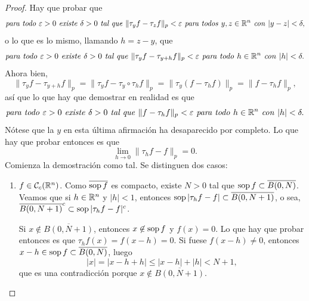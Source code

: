 \documentclass[a4paper, 11pt, oneside]{report}
\begin{document}
\begin{proof}
  Hay que probar que
  \[\textup{\emph{para todo }} \varepsilon > 0 \textup{\emph{ existe }} \delta > 0 \textup{\emph{ tal que }} \|\tau_yf - \tau_zf\|_p < \varepsilon \textup{\emph{ para todos }} y,z\in \mathbb R^n \textup{\emph{ con }} |y-z|<\delta,\]
  o lo que es lo mismo, llamando $h=z-y$, que
  \[\textup{\emph{para todo }} \varepsilon > 0 \textup{\emph{ existe }} \delta > 0 \textup{\emph{ tal que }} \|\tau_yf - \tau_{y+h}f\|_p < \varepsilon \textup{\emph{ para todo }} h\in \mathbb R^n \textup{\emph{ con }} |h|<\delta.\]
  Ahora bien,
  \[\|\tau_yf - \tau_{y+h}f\|_p = \|\tau_yf - \tau_y \circ \tau_h f\|_p = \|\tau_y(f - \tau_hf)\|_p = \|f - \tau_hf\|_p,\]
  así que lo que hay que demostrar en realidad es que
  \[\textup{\emph{para todo }} \varepsilon > 0 \textup{\emph{ existe }} \delta > 0 \textup{\emph{ tal que }} \|f-\tau_hf\|_p < \varepsilon \textup{\emph{ para todo }} h\in \mathbb R^n \textup{\emph{ con }} |h|<\delta.\]
  Nótese que la $y$ en esta última afirmación ha desaparecido por completo. Lo que hay que probar entonces es que
  \[\lim_{h \to 0} \|\tau_hf - f\|_p = 0.\]
  Comienza la demostración como tal. Se distinguen dos casos:
  \begin{enumerate}
    \item $f \in \mathcal{C}_c(\mathbb R^n)$. Como $\overline{\textup{sop}\, f}$ es compacto, existe $N > 0$ tal que $\textup{sop}\, f \subset \overline{B(0,N)}$. Veamos que si $h \in \mathbb R^n$ y $|h|<1$, entonces $\textup{sop}\,|\tau_hf-f| \subset \overline{B(0,N+1)}$, o sea, $\overline{B(0,N+1)}^c \subset \textup{sop}\,|\tau_hf - f|^c$.
    
    Si $x \not\in \overline{B(0,N+1)}$, entonces $x \not\in \textup{sop}\, f$ y $f(x)=0$. Lo que hay que probar entonces es que $\tau_hf(x) = f(x-h)=0$. Si fuese $f(x-h)\neq 0$, entonces $x-h \in \textup{sop}\, f \subset \overline{B(0,N)}$, luego
    \[|x| = |x-h+h| \leq |x-h|+|h| < N+1,\]
    que es una contradicción porque $x \not\in \overline{B(0,N+1)}$.


\end{enumerate}
\end{proof}
\end{document}
